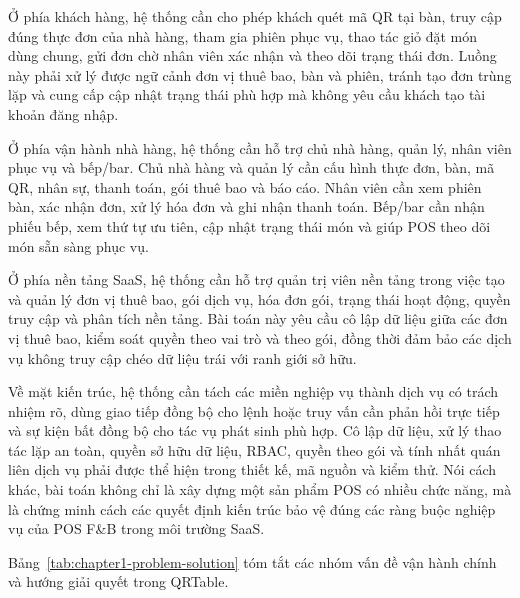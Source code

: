 Ở phía khách hàng, hệ thống cần cho phép khách quét mã QR tại bàn, truy cập đúng thực đơn của nhà hàng, tham gia phiên phục vụ, thao tác giỏ đặt món dùng chung, gửi đơn chờ nhân viên xác nhận và theo dõi trạng thái đơn. Luồng này phải xử lý được ngữ cảnh đơn vị thuê bao, bàn và phiên, tránh tạo đơn trùng lặp và cung cấp cập nhật trạng thái phù hợp mà không yêu cầu khách tạo tài khoản đăng nhập.

Ở phía vận hành nhà hàng, hệ thống cần hỗ trợ chủ nhà hàng, quản lý, nhân viên phục vụ và bếp/bar. Chủ nhà hàng và quản lý cần cấu hình thực đơn, bàn, mã QR, nhân sự, thanh toán, gói thuê bao và báo cáo. Nhân viên cần xem phiên bàn, xác nhận đơn, xử lý hóa đơn và ghi nhận thanh toán. Bếp/bar cần nhận phiếu bếp, xem thứ tự ưu tiên, cập nhật trạng thái món và giúp POS theo dõi món sẵn sàng phục vụ.

Ở phía nền tảng SaaS, hệ thống cần hỗ trợ quản trị viên nền tảng trong việc tạo và quản lý đơn vị thuê bao, gói dịch vụ, hóa đơn gói, trạng thái hoạt động, quyền truy cập và phân tích nền tảng. Bài toán này yêu cầu cô lập dữ liệu giữa các đơn vị thuê bao, kiểm soát quyền theo vai trò và theo gói, đồng thời đảm bảo các dịch vụ không truy cập chéo dữ liệu trái với ranh giới sở hữu.

Về mặt kiến trúc, hệ thống cần tách các miền nghiệp vụ thành dịch vụ có trách nhiệm rõ, dùng giao tiếp đồng bộ cho lệnh hoặc truy vấn cần phản hồi trực tiếp và sự kiện bất đồng bộ cho tác vụ phát sinh phù hợp. Cô lập dữ liệu, xử lý thao tác lặp an toàn, quyền sở hữu dữ liệu, RBAC, quyền theo gói và tính nhất quán liên dịch vụ phải được thể hiện trong thiết kế, mã nguồn và kiểm thử. Nói cách khác, bài toán không chỉ là xây dựng một sản phẩm POS có nhiều chức năng, mà là chứng minh cách các quyết định kiến trúc bảo vệ đúng các ràng buộc nghiệp vụ của POS F\&B trong môi trường SaaS.

Bảng~\ref{tab:chapter1-problem-solution} tóm tắt các nhóm vấn đề vận hành chính và hướng giải quyết trong QRTable.

